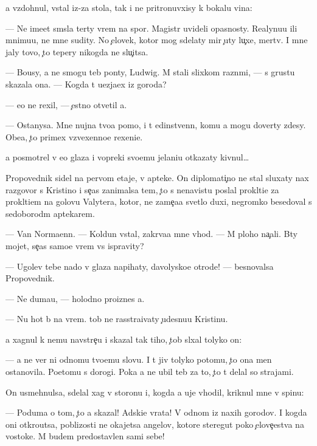 \documentclass[10pt]{book}
\begin{document}
{\Y}a vzdohnul, vstal iz-za stola, tak i ne pritronuvxisy k bokalu vina:

— Ne ime{\y}et sm{\yi}sla ter{\ia}ty vrem{\ia} na spor{\yi}. Magistr{\yi} uvideli opasnosty. Realynu{\y}u ili mnimu{\y}u, ne mne sudity. No {\c}elovek, kotor{\yi}{\y} mog sdelaty mir {\c}uty lu{\c}xe, mertv. I mne jaly tovo, {\c}to tepery nikogda ne slu{\c}itsa.

— Bo{\y}usy, {\y}a ne smogu teb{\ia} pon{\ia}ty, Ludwig. M{\yi} stali slixkom razn{\yi}mi, — s grust{\y}u skazala ona. — Kogda t{\yi} u{\y}ezja{\y}ex iz goroda?

— {\y}e{\x}o ne rexil, — {\c}estno otvetil {\y}a.

— Ostanysa. Mne nujna tvo{\y}a pomo{\x}, i t{\yi} {\y}edinstvenn{\yi}{\y}, komu {\y}a mogu dover{\ia}ty zdesy. Obe{\x}a{\y}, {\c}to primex vzvexenno{\y}e rexeni{\y}e.

{\Y}a posmotrel v {\y}e{\y}o glaza i vopreki svo{\y}emu jelani{\y}u otkazaty kivnul…

Propovednik sidel na pervom etaje, v apteke. On diplomati{\c}no ne stal sluxaty nax razgovor s Kristino{\y} i se{\y}{\c}as zanimalsa tem, {\c}to s nenavist{\y}u pos{\yi}lal prokl{\ia}ti{\y}e za prokl{\ia}ti{\y}em na golovu Valytera, kotor{\yi}{\y}, ne zame{\c}a{\y}a svetlo{\y} duxi, negromko besedoval s sedoborod{\yi}m aptekarem.

— Van Normaenn. — Koldun vstal, zakr{\yi}va{\y}a mne v{\yi}hod. — M{\yi} ploho na{\c}ali. B{\yi}ty mojet, se{\y}{\c}as samo{\y}e vrem{\ia} vs{\e} ispravity?

— Ugol{\y}ev tebe nado v glaza napihaty, d{\y}avolysko{\y}e otrod{\y}e! — besnovalsa Propovednik.

— Ne duma{\y}u, — holodno proiznes {\y}a.

— Nu hot{\ia} b{\yi} na vrem{\ia}. {\C}tob{\yi} ne rasstra{\y}ivaty {\c}udesnu{\y}u Kristinu.

{\Y}a xagnul k nemu navstre{\c}u i skazal tak tiho, {\c}tob{\yi} sl{\yi}xal tolyko on:

— {\Y}a ne ver{\iu} ni odnomu tvo{\y}emu slovu. I t{\yi} jiv tolyko potomu, {\c}to ona men{\ia} ostanovila. Poetomu s dorogi. Poka {\y}a ne ubil teb{\ia} za to, {\c}to t{\yi} delal so strajami.

On usmehnulsa, sdelal xag v storonu i, kogda {\y}a uje v{\yi}hodil, kriknul mne v spinu:

— Poduma{\y} o tom, {\c}to {\y}a skazal! Adski{\y}e vrata! V odnom iz naxih gorodov. I kogda oni otkro{\y}utsa, poblizosti ne okajetsa angelov, kotor{\yi}{\y}e steregut poko{\y} {\c}elove{\c}estva na vostoke. M{\yi} budem predostavlen{\yi} sami sebe!
\end{document}
